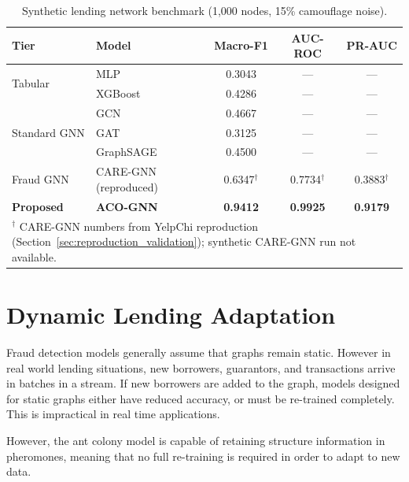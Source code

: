 \begin{table}[htbp]
\centering
\small
\setlength{\tabcolsep}{6pt}
\caption[Synthetic benchmark comparison across baseline tiers]{Synthetic lending network benchmark (1,000 nodes, 15\% camouflage noise).}
\label{tab:synthetic_main}
\begin{tabular}{llccc}
\toprule
\textbf{Tier} & \textbf{Model} & \textbf{Macro-F1} & \textbf{AUC-ROC} & \textbf{PR-AUC} \\
\midrule
\multirow{2}{*}{Tabular} & MLP           & 0.3043 & --- & --- \\
                          & XGBoost       & 0.4286 & --- & --- \\
\midrule
\multirow{3}{*}{Standard GNN} & GCN      & 0.4667 & --- & --- \\
                               & GAT      & 0.3125 & --- & --- \\
                               & GraphSAGE & 0.4500 & --- & --- \\
\midrule
Fraud GNN & CARE-GNN (reproduced) & 0.6347$^{\dagger}$ & 0.7734$^{\dagger}$ & 0.3883$^{\dagger}$ \\
\midrule
\textbf{Proposed} & \textbf{ACO-GNN} & \textbf{0.9412} & \textbf{0.9925} & \textbf{0.9179} \\
\bottomrule
\multicolumn{5}{p{0.92\linewidth}}{\footnotesize $^{\dagger}$ CARE-GNN numbers from YelpChi reproduction (Section~\ref{sec:reproduction_validation}); synthetic CARE-GNN run not available.}
\end{tabular}
\end{table}

\section[Dynamic Lending Adaptation]{Dynamic Lending Adaptation}
\label{sec:dynamic_lending_results}

Fraud detection models generally assume that graphs remain static. However in real world lending situations, new borrowers, guarantors, and transactions arrive in batches in a stream. If new borrowers are added to the graph, models designed for static graphs either have reduced accuracy, or must be re-trained completely. This is impractical in real time applications.

However, the ant colony model is capable of retaining structure information in pheromones, meaning that no full re-training is required in order to adapt to new data.

